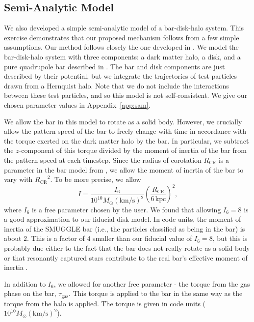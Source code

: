 \documentclass[twocolumn,linenumbers,trackchanges]{aastex631}
\newcommand{\RCR}{\ensuremath{R_{\textrm{CR}}}}
\newcommand{\kms}{\ensuremath{\textrm{km}/\textrm{s}}}
\newcommand{\SMUGGLE}{SMUGGLE}
\newcommand{\Msun}{\ensuremath{M_{\odot}}}
\begin{document}
\subsection{Semi-Analytic Model}
We also developed a simple semi-analytic model of a bar-disk-halo system. This
exercise demonstrates that our proposed mechanism follows from a few simple
assumptions. Our method follows closely the one developed in
\citet{2022MNRAS.513..768C}. We model the bar-disk-halo system with three
components: a dark matter \citet{1990ApJ...356..359H} halo, a
\citet{1975PASJ...27..533M} disk, and a pure quadrupole bar
described in \citet{2022MNRAS.513..768C}. The bar and disk components are just
described by their potential, but we integrate the trajectories of test
particles drawn from a Hernquist halo. Note that we do not include the
interactions between these test particles, and so this model is not
self-consistent. We give our chosen parameter values in Appendix~\ref{app:sam}.

We allow the bar in this model to rotate as a solid body. However, we crucially
allow the pattern speed of the bar to freely change with time in accordance with
the torque exerted on the dark matter halo by the bar. In particular, we
subtract the $z$-component of this torque divided by the moment of inertia of
the bar from the pattern speed at each timestep. Since the radius of corotation
\RCR{} is a parameter in the bar model from \citet{2022MNRAS.513..768C}, we
allow the moment of inertia of the bar to vary with ${\RCR}^2$. To be more
precise, we allow
\begin{equation}
I = \frac{I_6}{10^{10} \Msun (\kms)^2} \left( \frac{\RCR}{6\,\textrm{kpc}} \right)^2\textrm{,}
\end{equation}
where $I_6$ is a free parameter chosen by the user. We found that allowing
$I_6=8$ is a good approximation to our fiducial disk model. In code units, the
moment of inertia of the \SMUGGLE{} bar (i.e., the particles classified as being in
the bar) is about $2$. This is a factor of $4$ smaller than our fiducial value
of $I_6=8$, but this is probably due either to the fact that the bar does not
really rotate as a solid body or that resonantly captured stars contribute to
the real bar's effective moment of inertia \citep{1985MNRAS.213..451W}.

In addition to $I_6$, we allowed for another free parameter - the torque from
the gas phase on the bar, $\tau_{\textrm{gas}}$. This torque is applied to the
bar in the same way as the torque from the halo is applied. The torque is given
in code units ($10^{10}\Msun \left(\kms\right)^2$).
\end{document}

